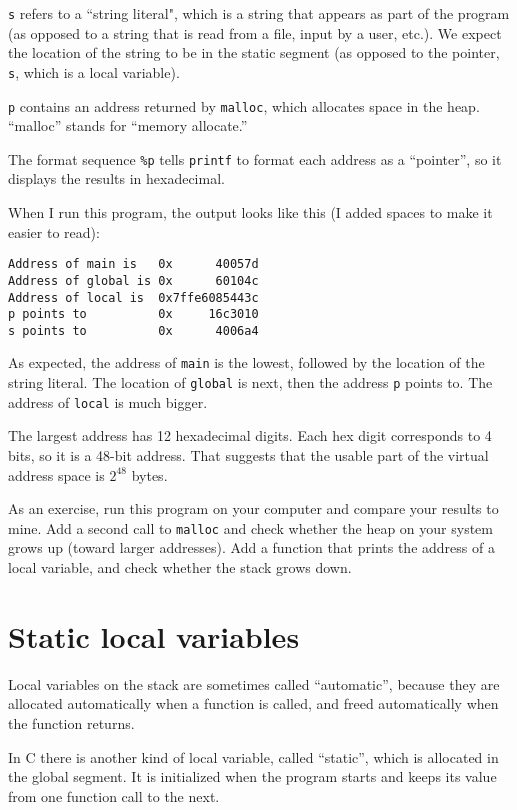 \documentclass[12pt]{book}
\begin{document}
{\tt s} refers to a ``string literal", which is a string that appears
as part of the program (as opposed to a string that is read from a file,
input by a user, etc.).  We expect the location of the string to be
in the static segment (as opposed to the pointer, {\tt s}, which is
a local variable).

{\tt p} contains an address returned by {\tt malloc}, which allocates
space in the heap.  ``malloc'' stands for ``memory allocate.''

The format sequence \verb"%p" tells {\tt printf} to format each
address as a ``pointer'', so it displays the results in hexadecimal.

When I run this program, the output looks like this (I added spaces
to make it easier to read):

\begin{verbatim}
Address of main is   0x      40057d
Address of global is 0x      60104c
Address of local is  0x7ffe6085443c
p points to          0x     16c3010
s points to          0x      4006a4

\end{verbatim}

As expected, the address of {\tt main} is the lowest, followed by
the location of the string literal.  The location of
{\tt global} is next, then the address {\tt p} points to.
The address of {\tt local} is much bigger.

The largest address has 12 hexadecimal digits.  Each hex digit
corresponds to 4 bits, so it is a 48-bit address.  That suggests
that the usable part of the virtual address space is $2^{48}$ bytes.

As an exercise, run this program on your computer and compare your
results to mine.  Add a second call to {\tt malloc} and check whether
the heap on your system grows up (toward larger addresses).  Add a
function that prints the address of a local variable, and check
whether the stack grows down.


\section{Static local variables}

Local variables on the stack are sometimes called ``automatic'',
because they are allocated automatically when a function is called,
and freed automatically when the function returns.

In C there is another kind of local variable, called ``static'',
which is allocated in the global segment.  It is initialized when
the program starts and keeps its value from one function call to
the next.
\end{document}
